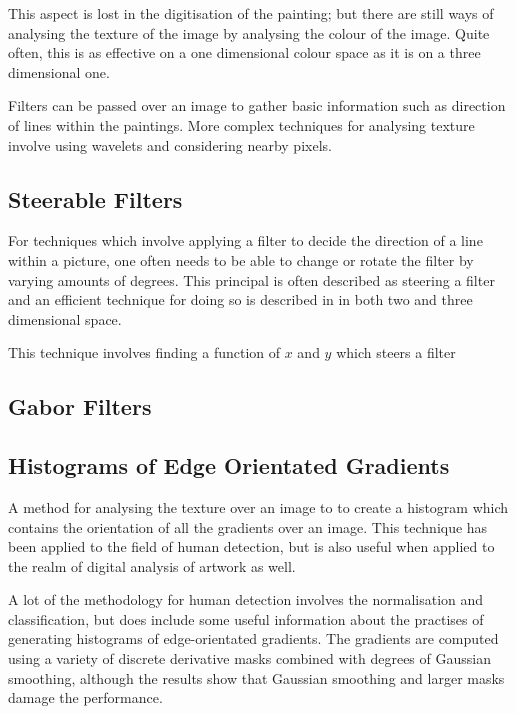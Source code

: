 \documentclass[conference]{IEEEtran}
\begin{document}
This aspect is lost in the digitisation of the painting; but there are still
ways of analysing the texture of the image by analysing the colour of the
image. Quite often, this is as effective on a one dimensional colour space as
it is on a three dimensional one.

Filters can be passed over an image to gather basic information such as
direction of lines within the paintings. More complex techniques for analysing
texture involve using wavelets and considering nearby pixels.

\subsection{Steerable Filters}

For techniques which involve applying a filter to decide the direction of a
line within a picture, one often needs to be able to change or rotate the
filter by varying amounts of degrees. This principal is often described as
steering a filter and an efficient technique for doing so is described in
\cite{freeman91design} in both two and three dimensional space.

This technique involves finding a function of $x$ and $y$ which steers a filter


\subsection{Gabor Filters}


\subsection{Histograms of Edge Orientated Gradients}

A method for analysing the texture over an image to to create a histogram which
contains the orientation of all the gradients over an image. This technique has
been applied to the field of human detection\cite{dalal05histograms}, but is
also useful when applied to the realm of digital analysis of artwork as well.

A lot of the methodology for human detection involves the normalisation and
classification, but does include some useful information about the practises of
generating histograms of edge-orientated gradients. The gradients are computed
using a variety of discrete derivative masks combined with degrees of Gaussian
smoothing, although the results show that Gaussian smoothing and larger masks
damage the performance.
\end{document}
